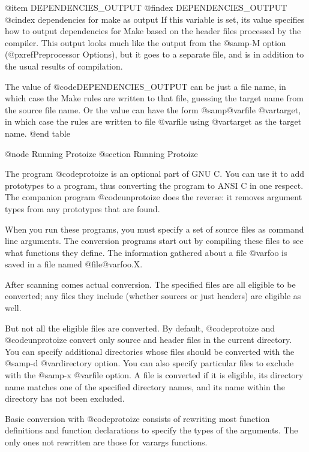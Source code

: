 {{@item DEPENDENCIES_OUTPUT
@findex DEPENDENCIES_OUTPUT
@cindex dependencies for make as output 
If this variable is set, its value specifies how to output dependencies
for Make based on the header files processed by the compiler.  This
output looks much like the output from the @samp{-M} option
(@pxref{Preprocessor Options}), but it goes to a separate file, and is
in addition to the usual results of compilation.

The value of @code{DEPENDENCIES_OUTPUT} can be just a file name, in
which case the Make rules are written to that file, guessing the target
name from the source file name.  Or the value can have the form
@samp{@var{file} @var{target}}, in which case the rules are written to
file @var{file} using @var{target} as the target name.
@end table

@node Running Protoize
@section Running Protoize

The program @code{protoize} is an optional part of GNU C.  You can use
it to add prototypes to a program, thus converting the program to ANSI
C in one respect.  The companion program @code{unprotoize} does the
reverse: it removes argument types from any prototypes that are found.

When you run these programs, you must specify a set of source files as
command line arguments.  The conversion programs start out by compiling
these files to see what functions they define.  The information gathered
about a file @var{foo} is saved in a file named @file{@var{foo}.X}.

After scanning comes actual conversion.  The specified files are all
eligible to be converted; any files they include (whether sources or
just headers) are eligible as well.

But not all the eligible files are converted.  By default,
@code{protoize} and @code{unprotoize} convert only source and header
files in the current directory.  You can specify additional directories
whose files should be converted with the @samp{-d @var{directory}}
option.  You can also specify particular files to exclude with the
@samp{-x @var{file}} option.  A file is converted if it is eligible, its
directory name matches one of the specified directory names, and its
name within the directory has not been excluded.

Basic conversion with @code{protoize} consists of rewriting most
function definitions and function declarations to specify the types of
the arguments.  The only ones not rewritten are those for varargs
functions.

}}
